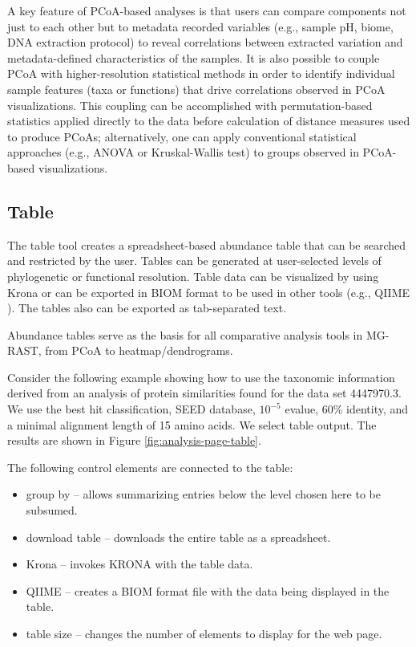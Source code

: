 \documentclass[12pt,fullpage]{report}
\begin{document}
A key feature of PCoA-based analyses is that users can compare components not just to each other but to metadata recorded variables (e.g., sample pH, biome, DNA extraction protocol) to reveal correlations between extracted variation and metadata-defined characteristics of the samples. It is also possible to couple PCoA with higher-resolution statistical methods in order to identify individual sample features (taxa or functions) that drive correlations observed in PCoA visualizations. This coupling can be accomplished with permutation-based statistics applied directly to the data before calculation of distance measures used to produce PCoAs; alternatively, one can apply conventional statistical approaches (e.g., ANOVA or Kruskal-Wallis test) to groups observed in PCoA-based visualizations.
\subsection*{Table}

The table tool creates a spreadsheet-based abundance table that can be searched and restricted by the user. Tables can be generated at user-selected levels of phylogenetic or functional resolution. Table data can be visualized by using Krona \cite{KRONA} or  can be exported in BIOM\cite{BIOM} format to be used in other tools (e.g., QIIME \cite{QIIME}).  The tables also can be exported as tab-separated text.

Abundance tables serve as the basis for all comparative analysis tools in MG-RAST, from PCoA to heatmap/dendrograms.

Consider the following example showing how to use
the taxonomic information derived from an analysis of protein similarities found for the data set 4447970.3.
We use the best hit classification, \gls{SEED} database, $10^{-5}$ evalue, 60\% identity, and a minimal alignment length of 15 amino acids. We select table output. The results are shown in Figure \ref{fig:analysis-page-table}.

The following control elements are connected to the table:
\begin{itemize}
\item group by --
allows summarizing entries below the level chosen here to be subsumed.

\item download table --
downloads the entire table as a spreadsheet.

\item Krona --
invokes KRONA \cite{KRONA} with the table data.

\item QIIME --
creates a BIOM\cite{BIOM} format file with the data being displayed in the table.

\item table size --
changes the number of elements to display for the web page.

\end{itemize}
\end{document}

